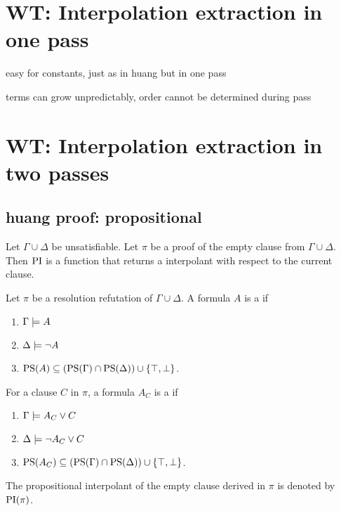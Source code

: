 
\section{WT: Interpolation extraction in one pass}

easy for constants, just as in huang but in one pass

terms can grow unpredictably, order cannot be determined during pass

\section{WT: Interpolation extraction in two passes}

\subsection{huang proof: propositional}


Let $\Gamma \cup \Delta$ be unsatisfiable. Let $\pi$ be a proof of the empty clause from $\Gamma \cup \Delta$. Then $\operatorname{PI}$ is a function that returns a interpolant with respect to the current clause. 

\begin{defi}
	Let $\pi$ be a resolution refutation of $\Gamma \cup \Delta$.
	A formula $A$ is a  if
	\label{def:rel_prop_interpol}
	\begin{enumerate}
		\item $\Gamma \models A$
			\label{rel_prop_interpol_cond1}
		\item $\Delta \models \lnot A$
			\label{rel_prop_interpol_cond2}
		\item $\operatorname{PS}(A) \subseteq (\operatorname{PS}(\Gamma) \cap \operatorname{PS}(\Delta)) \cup \{\top, \bot\} $.
			\label{rel_prop_interpol_cond_lang}
	\end{enumerate}


	For a clause $C$ in $\pi$, a formula $A_C$ is a  if
	\label{def:rel_prop_interpol}
	\begin{enumerate}
		\item $\Gamma \models A_C \lor C$
			\label{rel_prop_interpol_cond1}
		\item $\Delta \models \lnot A_C \lor C$
			\label{rel_prop_interpol_cond2}
		\item $\operatorname{PS}(A_C) \subseteq (\operatorname{PS}(\Gamma) \cap \operatorname{PS}(\Delta)) \cup \{\top, \bot\} $.
			\label{rel_prop_interpol_cond_lang}
	\end{enumerate}

	The propositional interpolant of the empty clause derived in $\pi$ is denoted by $\operatorname{PI}(\pi)$.\qedhere
\end{defi}

